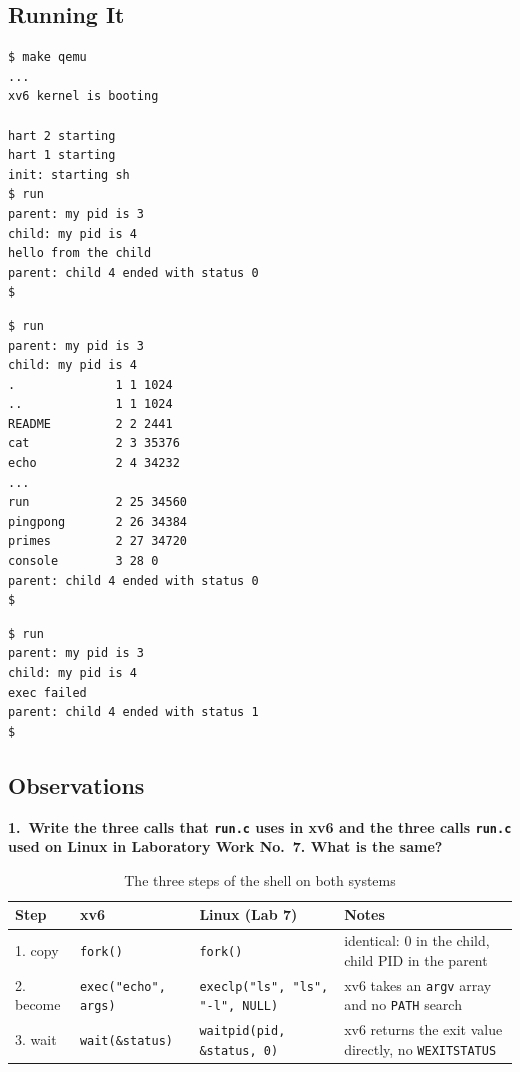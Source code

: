 \documentclass[12pt,a4paper]{article}
\newcommand{\qa}[2]{%
  \par\needspace{5\baselineskip}\medskip
  \noindent\textbf{#1.~#2}\par\smallskip\noindent}
\begin{document}
\subsection{Running It}

\begin{lstlisting}[style=terminal,caption={Step 1.2: the child becomes echo}]
$ make qemu
...
xv6 kernel is booting

hart 2 starting
hart 1 starting
init: starting sh
$ run
parent: my pid is 3
child: my pid is 4
hello from the child
parent: child 4 ended with status 0
$
\end{lstlisting}

\begin{lstlisting}[style=terminal,caption={Step 1.3: the child becomes ls}]
$ run
parent: my pid is 3
child: my pid is 4
.              1 1 1024
..             1 1 1024
README         2 2 2441
cat            2 3 35376
echo           2 4 34232
...
run            2 25 34560
pingpong       2 26 34384
primes         2 27 34720
console        3 28 0
parent: child 4 ended with status 0
$
\end{lstlisting}

\begin{lstlisting}[style=terminal,caption={Step 1.4: exec of a program that does not exist}]
$ run
parent: my pid is 3
child: my pid is 4
exec failed
parent: child 4 ended with status 1
$
\end{lstlisting}

\subsection*{Observations}

\qa{1}{Write the three calls that \texttt{run.c} uses in xv6 and the three calls \texttt{run.c} used on Linux in Laboratory Work No.~7. What is the same?}

\begin{table}[H]
  \centering
  \small
  \caption{The three steps of the shell on both systems}
  \begin{tabularx}{\textwidth}{l l l X}
    \toprule
    \textbf{Step} & \textbf{xv6} & \textbf{Linux (Lab 7)} & \textbf{Notes} \\
    \midrule
    1. copy      & \texttt{fork()}             & \texttt{fork()}                         & identical: 0 in the child, child PID in the parent \\
    2. become    & \texttt{exec("echo", args)} & \texttt{execlp("ls", "ls", "-l", NULL)} & xv6 takes an \texttt{argv} array and no \texttt{PATH} search \\
    3. wait      & \texttt{wait(\&status)}     & \texttt{waitpid(pid, \&status, 0)}      & xv6 returns the exit value directly, no \texttt{WEXITSTATUS} \\
    \bottomrule
  \end{tabularx}
\end{table}
\end{document}
